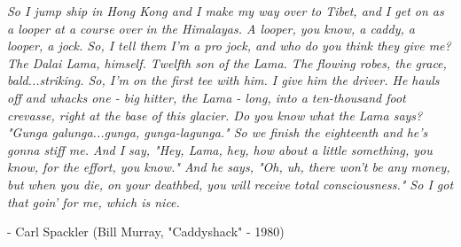 \documentclass[12pt]{article}
\begin{document}
\clearpage



\begin{adjustwidth}{1in}{1in}
    \vspace*{\fill}
    
    \textit{
        So I jump ship in Hong Kong and I make my way over to Tibet, and I get on as a
        looper at a course over in the Himalayas.
        A looper, you know, a caddy, a looper, a jock. So, I tell them I'm a pro jock,
        and who do you think they give me? The Dalai Lama, himself. Twelfth son of the Lama.
        The flowing robes, the grace, bald...striking. So, I'm on the first tee with him.
        I give him the driver. He hauls off and whacks one - big hitter, the Lama - long,
        into a ten-thousand foot crevasse, right at the base of this glacier.
        Do you know what the Lama says? "Gunga galunga...gunga, gunga-lagunga."
        So we finish the eighteenth and he's gonna stiff me. And I say, "Hey, Lama, hey,
        how about a little something, you know, for the effort, you know."
        And he says, "Oh, uh, there won't be any money, but when you die, on your deathbed,
        you will receive total consciousness." So I got that goin' for me, which is nice.
    }
    
    - Carl Spackler (Bill Murray, "Caddyshack" - 1980)
    
    \vfill
\end{adjustwidth}



\clearpage



\tableofcontents



\clearpage




\clearpage


\clearpage


\clearpage


\clearpage


\clearpage


\clearpage


\clearpage


\clearpage


\clearpage


\clearpage


\clearpage


\clearpage


\clearpage



\end{document}
